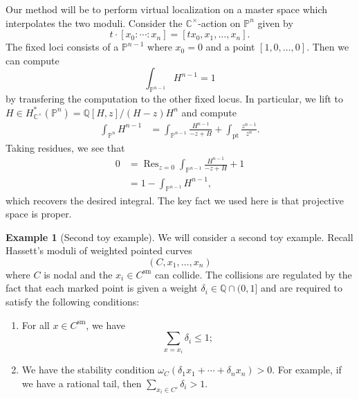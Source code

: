 \documentclass{amsart}
\theoremstyle{definition}
\newtheorem{exm}[thm]{Example}
\theoremstyle{remark}
\theoremstyle{plain}
\theoremstyle{definition}
\theoremstyle{remark}
\newcommand{\C}{\mathbb{C}}
\newcommand{\Q}{\mathbb{Q}}
\renewcommand{\P}{\mathbb{P}}
\newcommand{\mr}[1]{\mathrm{#1}}
\newcommand{\on}[1]{\operatorname{#1}}
\newcommand{\1}{\mathbf{1}}
\newcommand{\2}{\mathbf{2}}
\newcommand{\3}{\mathbf{3}}
\begin{document}
Our method will be to perform virtual localization on a master space which interpolates the two moduli. Consider the \(\C^{\times}\)-action on \(\P^n\) given by
\[ t \cdot [x_0 : \cdots : x_n] = [t x_0, x_1, \ldots, x_n]. \]
The fixed loci consists of a \(\P^{n-1}\) where \(x_0 = 0\) and a point \([1, 0, \ldots, 0]\). Then we can compute
\[ \int_{\P^{n-1}} H^{n-1} = 1 \]
by transfering the computation to the other fixed locus. In particular, we lift to \(H \in H_{\C^{\times}}^* (\P^n) = \Q[H,z] / (H-z)H^n\) and compute
\begin{align*}
    \int_{\P^n} H^{n-1} &= \int_{\P^{n-1}} \frac{H^{n-1}}{-z+H} + \int_{\mr{pt}} \frac{z^{n-1}}{z^n}.
\end{align*}
Taking residues, we see that
\begin{align*}
    0 &= \on{Res}_{z = 0}\int_{\P^{n-1}} \frac{H^{n-1}}{-z+H} + 1 \\
    &= 1 - \int_{\P^{n-1}}H^{n-1},
\end{align*}
which recovers the desired integral. The key fact we used here is that projective space is proper.

\begin{exm}[Second toy example]
    We will consider a second toy example. Recall Hassett's moduli of weighted pointed curves
    \[ (C, x_1, \ldots, x_n) \]
    where \(C\) is nodal and the \(x_i \in C^{\mr{sm}}\) can collide. The collisions are regulated by the fact that each marked point is given a weight \(\delta_i \in \Q \cap (0,1]\) and are required to satisfy the following conditions:
    \begin{enumerate}
        \item For all \(x \in C^{\mr{sm}}\), we have
            \[ \sum_{x = x_i} \delta_i \leq 1; \]
        \item We have the stability condition \(\omega_C(\delta_1 x_1 + \cdots + \delta_n x_n) > 0\). For example, if we have a rational tail, then \(\sum_{x_i \in C'} \delta_i > 1\).
    \end{enumerate}
\end{exm}
\end{document}

